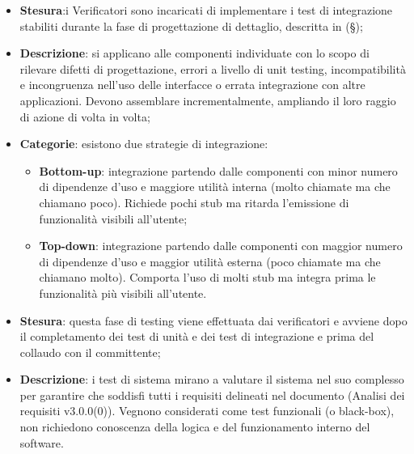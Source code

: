 \documentclass[10pt, a4paper]{article}
\begin{document}
\begin{itemize}
    \item \textbf{Stesura}:i Verificatori sono incaricati di implementare i test di integrazione stabiliti durante la fase di progettazione di dettaglio, descritta in (\S {});
    \item \textbf{Descrizione}: si applicano alle componenti individuate con lo scopo di rilevare difetti di progettazione, errori a livello di unit testing, incompatibilità e incongruenza nell'uso delle interfacce o errata integrazione con altre applicazioni. Devono assemblare incrementalmente, ampliando il loro raggio di azione di volta in volta;
    \item \textbf{Categorie}: esistono due strategie di integrazione:
    \begin{itemize}
        \item \textbf{Bottom-up}: integrazione partendo dalle componenti con minor numero di dipendenze d'uso e maggiore utilità interna (molto chiamate ma che chiamano poco). Richiede pochi stub ma ritarda l'emissione di funzionalità visibili all'utente;
        \item \textbf{Top-down}: integrazione partendo dalle componenti con maggior numero di dipendenze d'uso e maggior utilità esterna (poco chiamate ma che chiamano molto). Comporta l'uso di molti stub ma integra prima le funzionalità più visibili all'utente.
    \end{itemize}
\end{itemize}


\begin{itemize}
    \item \textbf{Stesura}: questa fase di testing viene effettuata dai verificatori e avviene dopo il completamento dei test di unità e dei test di integrazione e prima del collaudo con il committente;
    \item \textbf{Descrizione}: i test di sistema mirano a valutare il sistema nel suo complesso per garantire che soddisfi tutti i requisiti delineati nel documento (Analisi dei requisiti v3.0.0(0)). Vegnono considerati come test funzionali (o black-box), non richiedono conoscenza della logica e del funzionamento interno del software.
\end{itemize}
\end{document}
